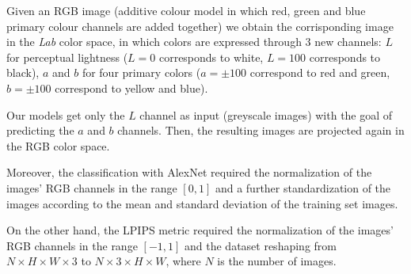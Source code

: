Given an RGB image (additive colour model in which red, green and blue primary colour channels are added together)
we obtain the corrisponding image in the \textit{Lab} color space, in which colors are expressed through 3 new
channels: $L$ for perceptual lightness ($L=0$ corresponds to white, $L=100$ corresponds to black), $a$ and $b$ for
four primary colors ($a=\pm100$ correspond to red and green, $b=\pm100$ correspond to yellow and blue).

Our models get only the $L$ channel as input (greyscale images) with the goal of predicting the $a$ and $b$
channels. Then, the resulting images are projected again in the RGB color space.

Moreover, the classification with AlexNet required the normalization of the images' RGB channels in the
range $[0,1]$ and a further standardization of the images according to the mean and standard deviation of the
training set images.

On the other hand, the LPIPS metric required the normalization of the images' RGB channels in the range $[-1,1]$ and
the dataset reshaping from $N\times H\times W\times3$ to $N\times3\times H\times W$, where $N$ is the number of images.